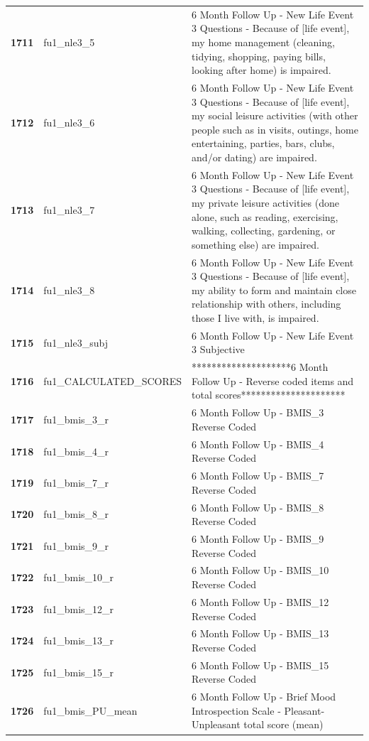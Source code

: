 \documentclass[
  letterpaper,
  DIV=11,
  numbers=noendperiod]{scrartcl}
\begin{document}
\begin{longtable}[t]{>{}cll}
\addlinespace
\textbf{1711} & fu1\_nle3\_5 & 6 Month Follow Up - New Life Event 3 Questions - Because of [life event], my home management (cleaning, tidying, shopping, paying bills, looking after home)  is impaired.\\
\textbf{1712} & fu1\_nle3\_6 & 6 Month Follow Up - New Life Event 3 Questions - Because of [life event], my social leisure activities (with other people such as in visits, outings, home entertaining, parties, bars, clubs, and/or dating) are impaired.\\
\textbf{1713} & fu1\_nle3\_7 & 6 Month Follow Up - New Life Event 3 Questions - Because of [life event], my private leisure activities (done alone, such as reading, exercising, walking, collecting, gardening, or something else) are impaired.\\
\textbf{1714} & fu1\_nle3\_8 & 6 Month Follow Up - New Life Event 3 Questions - Because of [life event], my ability to form and maintain close relationship with others, including those I live with, is impaired.\\
\textbf{1715} & fu1\_nle3\_subj & 6 Month Follow Up - New Life Event 3 Subjective\\
\addlinespace
\textbf{1716} & fu1\_CALCULATED\_SCORES & ********************6 Month Follow Up - Reverse coded items and total scores*********************\\
\textbf{1717} & fu1\_bmis\_3\_r & 6 Month Follow Up - BMIS\_3 Reverse Coded\\
\textbf{1718} & fu1\_bmis\_4\_r & 6 Month Follow Up - BMIS\_4 Reverse Coded\\
\textbf{1719} & fu1\_bmis\_7\_r & 6 Month Follow Up - BMIS\_7 Reverse Coded\\
\textbf{1720} & fu1\_bmis\_8\_r & 6 Month Follow Up - BMIS\_8 Reverse Coded\\
\addlinespace
\textbf{1721} & fu1\_bmis\_9\_r & 6 Month Follow Up - BMIS\_9 Reverse Coded\\
\textbf{1722} & fu1\_bmis\_10\_r & 6 Month Follow Up - BMIS\_10 Reverse Coded\\
\textbf{1723} & fu1\_bmis\_12\_r & 6 Month Follow Up - BMIS\_12 Reverse Coded\\
\textbf{1724} & fu1\_bmis\_13\_r & 6 Month Follow Up - BMIS\_13 Reverse Coded\\
\textbf{1725} & fu1\_bmis\_15\_r & 6 Month Follow Up - BMIS\_15 Reverse Coded\\
\addlinespace
\textbf{1726} & fu1\_bmis\_PU\_mean & 6 Month Follow Up - Brief Mood Introspection Scale - Pleasant-Unpleasant total score (mean)\\

\end{longtable}
\end{document}
